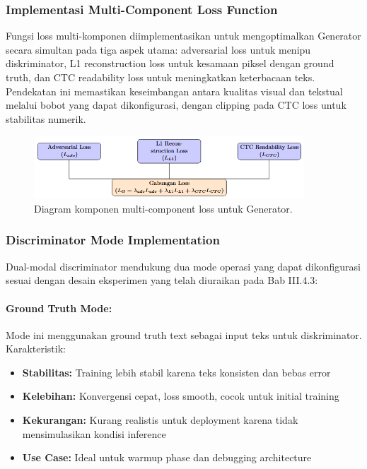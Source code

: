 \documentclass[12pt,a4paper]{article}
\begin{document}
\subsubsection{Implementasi Multi-Component Loss Function}
\label{subsubsec:loss-implementation}

Fungsi loss multi-komponen diimplementasikan untuk mengoptimalkan Generator secara simultan pada tiga aspek utama: adversarial loss untuk menipu diskriminator, L1 reconstruction loss untuk kesamaan piksel dengan ground truth, dan CTC readability loss untuk meningkatkan keterbacaan teks. Pendekatan ini memastikan keseimbangan antara kualitas visual dan tekstual melalui bobot yang dapat dikonfigurasi, dengan clipping pada CTC loss untuk stabilitas numerik.

\begin{figure}[H]
\centering
\includegraphics[width=0.9\textwidth]{images/gambarMultiComponentLoss.png}
\caption{Diagram komponen multi-component loss untuk Generator.}
\label{fig:multi-loss}
\end{figure}

\subsubsection{Discriminator Mode Implementation}
\label{subsubsec:discriminator-mode-impl}

Dual-modal discriminator mendukung dua mode operasi yang dapat dikonfigurasi sesuai dengan desain eksperimen yang telah diuraikan pada Bab III.4.3:

\paragraph{Ground Truth Mode:}
Mode ini menggunakan ground truth text sebagai input teks untuk diskriminator. Karakteristik:
\begin{itemize}[leftmargin=*, nosep]
\item \textbf{Stabilitas:} Training lebih stabil karena teks konsisten dan bebas error
\item \textbf{Kelebihan:} Konvergensi cepat, loss smooth, cocok untuk initial training
\item \textbf{Kekurangan:} Kurang realistis untuk deployment karena tidak mensimulasikan kondisi inference
\item \textbf{Use Case:} Ideal untuk warmup phase dan debugging architecture
\end{itemize}
\end{document}
